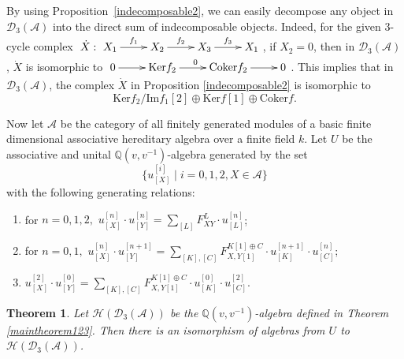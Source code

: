\documentclass{amsart}
\newtheorem{theorem}{Theorem}[section]
\theoremstyle{definition}
\numberwithin{equation}{section}
\begin{document}
By using Proposition~\ref{indecomposable2}, we can easily decompose
any object in ${{\mathcal{D}}}_3(\mathcal{A})$ into the direct sum of
indecomposable objects. Indeed, for the given $3$-cycle complex $
\xymatrix{\dot{X}:\,\,
 X_1\ar[r]^-{f_1}&X_2\ar[r]^{f_2}&X_3\ar[r]^{f_3}&X_1}$,
if $X_2=0$, then in ${{\mathcal{D}}}_3(\mathcal{A})$, $\dot{X}$ is isomorphic to
$\xymatrix{0\ar[r]&\mathrm{Ker}f_2\ar[r]^{0}&\mathrm{Coker}f_2\ar[r]&0}$.
This implies that in ${{\mathcal{D}}}_3(\mathcal{A})$, the complex $\dot{X}$ in
Proposition \ref{indecomposable2} is isomorphic to
$$
\mathrm{Ker}f_2/\mathrm{Im}f_1[2]\oplus \mathrm{Ker}f[1]\oplus
\mathrm{Coker}f.
$$

Now let $\mathcal{A}$ be the category of all finitely generated
modules of a basic finite dimensional associative hereditary algebra
over a finite field $k$. Let $U$ be the associative and unital
${{\mathbb Q}}(v, v^{-1})$-algebra generated by the set
$$
\{u^{[i]}_{[X]}\mid i=0,1,2,  X\in \mathcal{A}\}
$$
with the following generating relations:
\begin{enumerate}
  \item for $n=0,1,2,$ $u_{[X]}^{[n]}\cdot u_{[Y]}^{[n]}=\displaystyle\sum_{[L]}F_{XY}^L\cdot
  u_{[L]}^{[n]}$; {\vspace{0.2cm}}
  \item for $n=0, 1,$ $u_{[X]}^{[n]}\cdot u_{[Y]}^{[n+1]}=\displaystyle\sum_{[K],[C]}F_{X,Y[1]}^{K[1]\oplus C}\cdot
  u_{[K]}^{[n+1]}\cdot u_{[C]}^{[n]}$; {\vspace{0.2cm}}
  \item $u_{[X]}^{[2]}\cdot u_{[Y]}^{[0]}=\displaystyle\sum_{[K],[C]}F_{X,Y[1]}^{K[1]\oplus C}\cdot
  u_{[K]}^{[0]}\cdot u_{[C]}^{[2]}$.
\end{enumerate}
\begin{theorem}\label{structure}
 Let $\mathcal{H}({{\mathcal{D}}}_3(\mathcal{A}))$ be the
${{\mathbb Q}}(v, v^{-1})$-algebra defined in Theorem \ref{maintheorem123}.
Then there is an isomorphism of algebras from $U$ to
$\mathcal{H}({{\mathcal{D}}}_3(\mathcal{A}))$.
\end{theorem}
\end{document}
